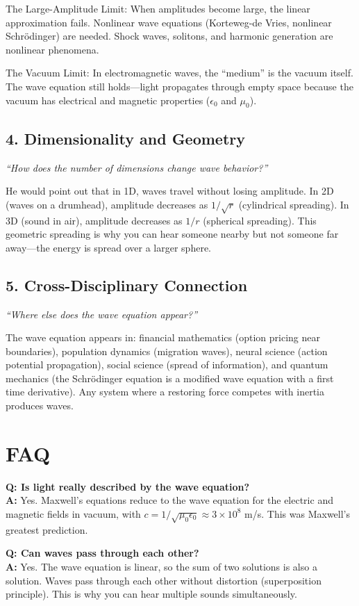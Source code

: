 The Large-Amplitude Limit: When amplitudes become large, the linear approximation fails. Nonlinear wave equations (Korteweg-de Vries, nonlinear Schr\"odinger) are needed. Shock waves, solitons, and harmonic generation are nonlinear phenomena.

The Vacuum Limit: In electromagnetic waves, the ``medium'' is the vacuum itself. The wave equation still holds---light propagates through empty space because the vacuum has electrical and magnetic properties ($\epsilon_0$ and $\mu_0$).

\subsection*{4. Dimensionality and Geometry}
\textit{``How does the number of dimensions change wave behavior?''}

He would point out that in 1D, waves travel without losing amplitude. In 2D (waves on a drumhead), amplitude decreases as $1/\sqrt{r}$ (cylindrical spreading). In 3D (sound in air), amplitude decreases as $1/r$ (spherical spreading). This geometric spreading is why you can hear someone nearby but not someone far away---the energy is spread over a larger sphere.

\subsection*{5. Cross-Disciplinary Connection}
\textit{``Where else does the wave equation appear?''}

The wave equation appears in: financial mathematics (option pricing near boundaries), population dynamics (migration waves), neural science (action potential propagation), social science (spread of information), and quantum mechanics (the Schr\"odinger equation is a modified wave equation with a first time derivative). Any system where a restoring force competes with inertia produces waves.
\section*{FAQ}

\textbf{Q: Is light really described by the wave equation?}\\
\textbf{A:} Yes. Maxwell's equations reduce to the wave equation for the electric and magnetic fields in vacuum, with $c = 1/\sqrt{\mu_0 \epsilon_0} \approx 3 \times 10^8$ m/s. This was Maxwell's greatest prediction.

\textbf{Q: Can waves pass through each other?}\\
\textbf{A:} Yes. The wave equation is linear, so the sum of two solutions is also a solution. Waves pass through each other without distortion (superposition principle). This is why you can hear multiple sounds simultaneously.
